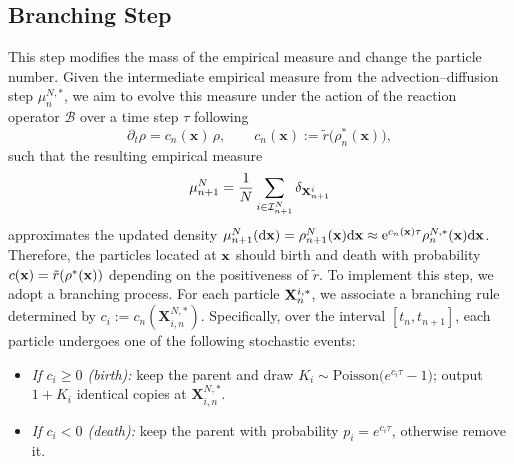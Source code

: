 \documentclass[a4paper,fleqn]{cas-sc}
\theoremstyle{definition}
\theoremstyle{remark}
\begin{document}
\subsection{Branching Step}
\label{sec:branching}
This step modifies the mass of the empirical measure and change the particle number. Given the intermediate empirical measure from the advection--diffusion step $\mu^{N,*}_n$, we aim to evolve this measure under the action of the reaction operator $\mathcal  B$ over a time step $\tau$ following
\[
\partial_t \rho = c_n(\mathbf{x})\,\rho,
\qquad c_n(\mathbf{x}) := \tilde r\!\big(\rho_n^\ast(\mathbf{x})\big),
\]
such that the resulting empirical measure
\begin{equation}
    \mu^N_{n+1} = \frac{1}{N} \sum_{i\in \mathcal I^N_{n+1}} \delta_{\mathbf{X}^i_{n+1}}
\end{equation}
approximates the updated density $\mu^N_{n+1}(\mathrm{d} \mathbf{x} ) = \rho^N_{n+1}(\mathbf{x}) \mathrm{d} \mathbf{x} \approx {\rm e}^{c_n(\mathbf{x}) \tau} \rho_{n}^{N,*}(\mathbf{x}) \mathrm{d} \mathbf{x}$. Therefore, the particles located at $\mathbf{x}$ should birth and death with probability $c(\mathbf{x})=\tilde r(\rho^*(\mathbf{x}))$ depending on the positiveness of $\tilde r$.
To implement this step, we adopt a branching process. For each particle $\mathbf{X}^{i,*}_n$, we associate a branching rule determined by $c_i:=c_n(\mathbf X^{N,\ast}_{i,n})$. Specifically, over the interval $[t_n,t_{n+1}]$, each particle undergoes one of the following stochastic events:
\begin{itemize}
  \item \emph{If \(c_i\ge 0\) (birth):} keep the parent and draw \(K_i\sim \mathrm{Poisson}\!\big(e^{c_i\tau}-1\big)\); output \(1+K_i\) identical copies at \(\mathbf X^{N,\ast}_{i,n}\).
  \item \emph{If \(c_i<0\) (death):} keep the parent with probability \(p_i=e^{c_i\tau}\), otherwise remove it.
\end{itemize}
\end{document}

